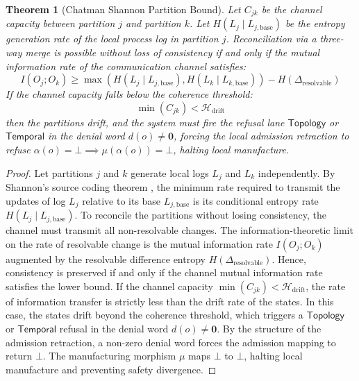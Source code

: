 \documentclass[11pt,oneside]{book}
\theoremstyle{definition}
\theoremstyle{plain}
\newtheorem{theorem}{Theorem}[chapter]
\theoremstyle{remark}
\begin{document}
\begin{theorem}[Chatman Shannon Partition Bound]\label{thm:shannon_partition}
Let $C_{jk}$ be the channel capacity between partition $j$ and partition $k$. %
Let $H(L_j \mid L_{j, \text{base}})$ be the entropy generation rate of the local process log in partition $j$. %
Reconciliation via a three-way merge is possible without loss of consistency if and only if the mutual information rate of the communication channel satisfies: %
\[
I(O_j; O_k) \ge \max\left( H(L_j \mid L_{j, \text{base}}), H(L_k \mid L_{k, \text{base}}) \right) - H(\Delta_{\text{resolvable}})
\]
If the channel capacity falls below the coherence threshold: %
\[
\min(C_{jk}) < \mathcal{H}_{\text{drift}}
\]
then the partitions drift, and the system must fire the refusal lane $\textsf{Topology}$ or $\textsf{Temporal}$ in the denial word $d(o) \neq \mathbf{0}$, forcing the local admission retraction to refuse $\alpha(o) = \bot \implies \mu(\alpha(o)) = \bot$, halting local manufacture. %
\end{theorem}

\begin{proof}
Let partitions $j$ and $k$ generate local logs $L_j$ and $L_k$ independently. %
By Shannon's source coding theorem \cite{shannon1948}, the minimum rate required to transmit the updates of log $L_j$ relative to its base $L_{j, \text{base}}$ is its conditional entropy rate $H(L_j \mid L_{j, \text{base}})$. %
To reconcile the partitions without losing consistency, the channel must transmit all non-resolvable changes. %
The information-theoretic limit on the rate of resolvable change is the mutual information rate $I(O_j; O_k)$ augmented by the resolvable difference entropy $H(\Delta_{\text{resolvable}})$. %
Hence, consistency is preserved if and only if the channel mutual information rate satisfies the lower bound. %
If the channel capacity $\min(C_{jk}) < \mathcal{H}_{\text{drift}}$, the rate of information transfer is strictly less than the drift rate of the states. %
In this case, the states drift beyond the coherence threshold, which triggers a $\textsf{Topology}$ or $\textsf{Temporal}$ refusal in the denial word $d(o) \neq \mathbf{0}$. %
By the structure of the admission retraction, a non-zero denial word forces the admission mapping to return $\bot$. %
The manufacturing morphism $\mu$ maps $\bot$ to $\bot$, halting local manufacture and preventing safety divergence. %
\end{proof}
\end{document}
